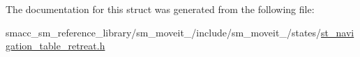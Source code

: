 The documentation for this struct was generated from the following file\+:\begin{DoxyCompactItemize}
\item 
smacc\+\_\+sm\+\_\+reference\+\_\+library/sm\+\_\+moveit\+\_/include/sm\+\_\+moveit\+\_/states/\hyperlink{st__navigation__table__retreat_8h}{st\+\_\+navigation\+\_\+table\+\_\+retreat.\+h}\end{DoxyCompactItemize}
